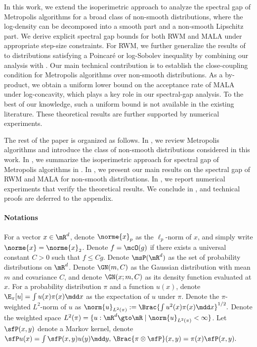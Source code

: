 \documentclass[11pt]{article}
\begin{document}
In this work, we extend the isoperimetric approach to analyze the spectral gap of Metropolis algorithms for a broad class of non-smooth distributions, where the log-density can be decomposed into a smooth part and a non-smooth Lipschitz part.
We derive explicit spectral gap bounds for both RWM and MALA under appropriate step-size constraints.
For RWM, we further generalize the results of \cite{24-AAP2058} to distributions satisfying a Poincar\'e or log-Sobolev inequality by combining our analysis with \cite{goyal2025mixing}.
%
Our main technical contribution is to establish the close-coupling condition \citep{MR2178341} for Metropolis algorithms over non-smooth distributions.
As a by-product, we obtain a uniform lower bound on the acceptance rate of MALA under log-concavity, which plays a key role in our spectral-gap analysis. To the best of our knowledge, such a uniform bound is not available in the existing literature.
These theoretical results are further supported by numerical experiments.



The rest of the paper is organized as follows.
In , we review Metropolis algorithms and introduce the class of non-smooth distributions considered in this work.
In , we summarize the isoperimetric approach for spectral gap of Metropolis algorithms in \cite{24-AAP2058,goyal2025mixing}.
In , we present our main results on the spectral gap of RWM and MALA for non-smooth distributions.
In , we report numerical experiments that verify the theoretical results.
We conclude in , and technical proofs are deferred to the appendix.




\paragraph{Notations}
For a vector $x\in\mR^d$, denote $\norme{x}_p$ as the $\ell_p$-norm of $x$, and simply write $\norme{x} = \norme{x}_2$.
Denote $f = \mcO(g)$ if there exists a universal constant $C>0$ such that $f \le C g$.
Denote $\msP(\mR^d)$ as the set of probability distributions on $\mR^d$.
Denote $\GN(m,C)$ as the Gaussian distribution with mean $m$ and covariance $C$, and denote $\GN(x;m,C)$ as its density function evaluated at $x$.
For a probability distribution $\pi$ and a function $u(x)$, denote $\E_\pi[u] = \int u(x) \pi(x) \mdd x$ as the expectation of $u$ under $\pi$.
Denote the $\pi$-weighted $L^2$-norm of $u$ as
\(
    \norm{u}_{L^2(\pi)} := \Brac{\int u^2(x) \pi(x) \mdd x}^{1/2}.
\)
Denote the weighted space $L^2(\pi) = \{ u:\mR^d\gto \mR \mid \norm{u}_{L^2(\pi)} <\infty \}$.
Let $\sfP(x,y)$ denote a Markov kernel, denote 
\(
    \sfP u(x) = \int \sfP(x,y) u(y) \mdd y,\, 
    \Brac{ \pi \otimes \sfP } (x,y) = \pi(x) \sfP(x,y).
\)
\end{document}
